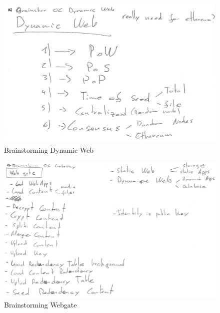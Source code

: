 \begin{figure}[htpb]
\centering
\begin{adjustbox}{center}
\includegraphics[scale=0.8]{annexes/concepts/oc-brainstorm-dynamic-web.png}
\end{adjustbox}
\caption{Brainstorming Dynamic Web
\label{fig:oc-brainstorm-dynamic-web}} 
\end{figure}

\begin{figure}[htpb]
\centering
\begin{adjustbox}{center}
\includegraphics[scale=0.6]{annexes/concepts/oc-brainstorm-webgate.png}
\end{adjustbox}
\caption{Brainstorming Webgate
\label{fig:oc-brainstorm-webgate}} 
\end{figure}

